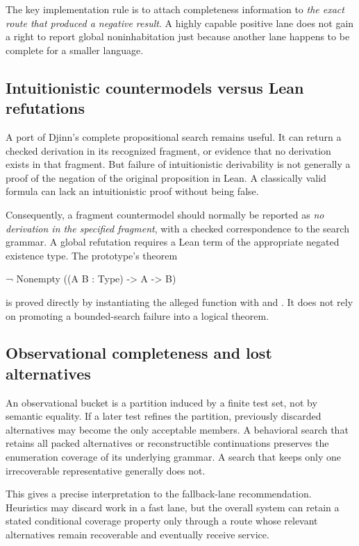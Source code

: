 \documentclass[11pt,letterpaper]{article}
\newcommand{\id}[1]{\texttt{\detokenize{#1}}}
\theoremstyle{definition}
\theoremstyle{remark}
\begin{document}
The key implementation rule is to attach completeness information to \emph{the exact route that produced a negative result}. A highly capable positive lane does not gain a right to report global noninhabitation just because another lane happens to be complete for a smaller language.

\subsection{Intuitionistic countermodels versus Lean refutations}

A port of Djinn's complete propositional search remains useful. It can return a checked derivation in its recognized fragment, or evidence that no derivation exists in that fragment. But failure of intuitionistic derivability is not generally a proof of the negation of the original proposition in Lean. A classically valid formula can lack an intuitionistic proof without being false.

Consequently, a fragment countermodel should normally be reported as \emph{no derivation in the specified fragment}, with a checked correspondence to the search grammar. A global refutation requires a Lean term of the appropriate negated existence type. The prototype's theorem
\begin{code}
¬ Nonempty ((A B : Type) -> A -> B)
\end{code}
is proved directly by instantiating the alleged function with \id{Unit} and \id{Empty}. It does not rely on promoting a bounded-search failure into a logical theorem.

\subsection{Observational completeness and lost alternatives}

An observational bucket is a partition induced by a finite test set, not by semantic equality. If a later test refines the partition, previously discarded alternatives may become the only acceptable members. A behavioral search that retains all packed alternatives or reconstructible continuations preserves the enumeration coverage of its underlying grammar. A search that keeps only one irrecoverable representative generally does not.

This gives a precise interpretation to the fallback-lane recommendation. Heuristics may discard work in a fast lane, but the overall system can retain a stated conditional coverage property only through a route whose relevant alternatives remain recoverable and eventually receive service.
\end{document}
